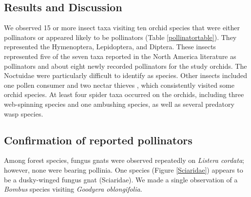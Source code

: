 \begin{multicols}{2} 

\section{Results and Discussion}

We observed 15 or more insect taxa visiting ten orchid species that were
either pollinators or appeared likely to be pollinators (Table \ref{pollinatortable}). They
represented the Hymenoptera, Lepidoptera, and Diptera. These insects
represented five of the seven taxa reported in the North America
literature as pollinators and about eight newly recorded pollinators for
the study orchids. The Noctuidae were particularly difficult to identify
as species. Other insects included one pollen consumer and two nectar
thieves \citep{Inouye1980}, which consistently visited some orchid species.
At least four spider taxa occurred on the orchids, including three
web-spinning species and one ambushing species, as well as several
predatory wasp species.

\subsection{Confirmation of reported pollinators}

Among forest species, fungus gnats were observed repeatedly on
\emph{Listera cordata}; however, none were bearing pollinia. One species
(Figure \ref{Sciaridae}) appears to be a dusky-winged fungus gnat (Sciaridae).
We made a single observation of a \emph{Bombus} species visiting \emph{Goodyera
oblongifolia}.


\end{multicols}
